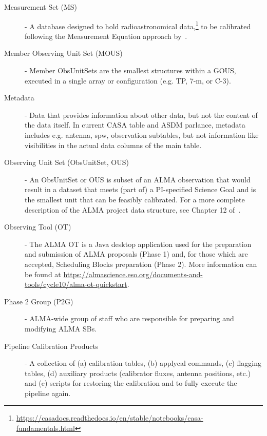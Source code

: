 \begin{description}
\item[Measurement Set (MS)] - A database designed to hold radioastronomical data,\footnote{\url{https://casadocs.readthedocs.io/en/stable/notebooks/casa-fundamentals.html}} to be calibrated following the Measurement Equation approach by~\cite{Hamaker1996}.
\item[Member Observing Unit Set (MOUS)] - Member ObsUnitSets are the smallest structures within a GOUS, executed in a single array or configuration (e.g. TP, 7-m, or C-3).
\item[Metadata] - Data that provides information about other data, but not the content of the data itself. In current CASA table and ASDM parlance, metadata includes e.g. antenna, spw, observation subtables, but not information like visibilities in the actual data columns of the main table.
\item[Observing Unit Set (ObsUnitSet, OUS)] - An ObsUnitSet or OUS is subset of an ALMA observation that would result in a dataset that meets (part of) a PI-specified Science Goal and is the smallest unit that can be feasibly calibrated. For a more complete description of the ALMA project data structure, see Chapter 12 of~\cite{c10_thb}.
\item[Observing Tool (OT)] - The ALMA OT is a Java desktop application used for the preparation and submission of ALMA proposals (Phase 1) and, for those which are accepted, Scheduling Blocks preparation (Phase 2). 
More information can be found at \url{https://almascience.eso.org/documents-and-tools/cycle10/alma-ot-quickstart}.
\item[Phase 2 Group (P2G)] - ALMA-wide group of staff who are responsible for preparing and modifying ALMA SBs. 
\item[Pipeline Calibration Products] - A collection of (a) calibration tables, (b) applycal commands, (c) flagging tables, (d) auxiliary products (calibrator fluxes, antenna positions, etc.) and (e) scripts for restoring the calibration and to fully execute the pipeline again. 

\end{description}
